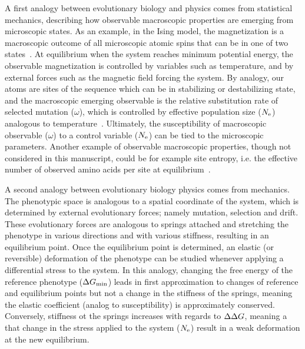 A first analogy between evolutionary biology and physics comes from statistical mechanics, describing how observable macroscopic properties are emerging from microscopic states.
As an example, in the Ising model, the magnetization is a macroscopic outcome of all microscopic atomic spins that can be in one of two states~\citep{Brush1967}.
At equilibrium when the system reaches minimum potential energy, the observable magnetization is controlled by variables such as temperature, and by external forces such as the magnetic field forcing the system.
By analogy, our atoms are sites of the sequence which can be in stabilizing or destabilizing state, and the macroscopic emerging observable is the relative substitution rate of selected mutation ($\omega$), which is controlled by effective population size ($N_{\text{e}}$) analogous to temperature~\citep{Sella2005}.
Ultimately, the susceptibility of macroscopic observable ($\omega$) to a control variable ($N_{\text{e}}$) can be tied to the microscopic parameters.
Another example of observable macroscopic properties, though not considered in this manuscript, could be for example site entropy, i.e. the effective number of observed amino acids per site at equilibrium~\citep{Goldstein2016, Jimenez2018, Jiang2018}.

A second analogy between evolutionary biology physics comes from mechanics.
The phenotypic space is analogous to a spatial coordinate of the system, which is determined by external evolutionary forces; namely mutation, selection and drift.
These evolutionary forces are analogous to springs attached and stretching the phenotype in various directions and with various stiffness, resulting in an equilibrium point.
Once the equilibrium point is determined, an elastic (or reversible) deformation of the phenotype can be studied whenever applying a differential stress to the system.
In this analogy, changing the free energy of the reference phenotype ($\Delta G_{\text{min}}$) leads in first approximation to changes of reference and equilibrium points but not a change in the stiffness of the springs, meaning the elastic coefficient (analog to susceptibility) is approximately conserved.
Conversely, stiffness ot the springs increases with regards to $\Delta \Delta G$, meaning a that change in the stress applied to the system ($N_{\text{e}}$) result in a weak deformation at the new equilibrium.

